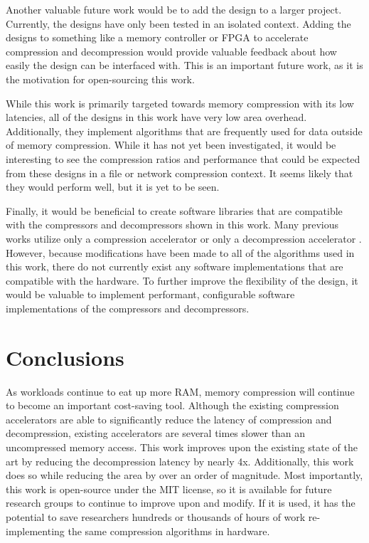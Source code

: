 \documentclass[doublespace,nopageskip]{VTthesis}
\begin{document}
Another valuable future work would be to add the design to a larger project. Currently, the designs have only been tested in an isolated context. Adding the designs to something like a memory controller or FPGA to accelerate compression and decompression would provide valuable feedback about how easily the design can be interfaced with. This is an important future work, as it is the motivation for open-sourcing this work.

While this work is primarily targeted towards memory compression with its low latencies, all of the designs in this work have very low area overhead. Additionally, they implement algorithms that are frequently used for data outside of memory compression. While it has not yet been investigated, it would be interesting to see the compression ratios and performance that could be expected from these designs in a file or network compression context.  It seems likely that they would perform well, but it is yet to be seen.

Finally, it would be beneficial to create software libraries that are compatible with the compressors and decompressors shown in this work. Many previous works utilize only a compression accelerator or only a decompression accelerator \cite{hardwarelz4, fpgahuffmanlz77, gziponachip, hdfsgzip, ribeiro, deflatedecompression, lzrw1}. However, because modifications have been made to all of the algorithms used in this work, there do not currently exist any software implementations that are compatible with the hardware.  To further improve the flexibility of the design, it would be valuable to implement performant, configurable software implementations of the compressors and decompressors.

\chapter{Conclusions} \label{ch:conclusions}
As workloads continue to eat up more RAM, memory compression will continue to become an important cost-saving tool. Although the existing compression accelerators are able to significantly reduce the latency of compression and decompression, existing accelerators are several times slower than an uncompressed memory access. This work improves upon the existing state of the art by reducing the decompression latency by nearly 4x. Additionally, this work does so while reducing the area by over an order of magnitude. Most importantly, this work is open-source under the MIT license, so it is available for future research groups to continue to improve upon and modify. If it is used, it has the potential to save researchers hundreds or thousands of hours of work re-implementing the same compression algorithms in hardware.
\end{document}
